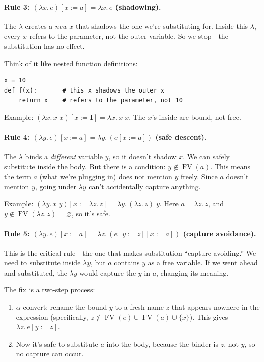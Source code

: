 \documentclass[11pt,a4paper]{article}
\theoremstyle{definition}
\newcommand{\lam}{\lambda}
\newcommand{\FV}{\operatorname{FV}}
\begin{document}
\paragraph{Rule 3: $(\lam x.\, e)[x := a] = \lam x.\, e$ (shadowing).}
The $\lam$ creates a \emph{new} $x$ that shadows the one we're substituting
for. Inside this $\lam$, every $x$ refers to the parameter, not the outer
variable. So we stop---the substitution has no effect.

Think of it like nested function definitions:
\begin{verbatim}
x = 10
def f(x):       # this x shadows the outer x
    return x    # refers to the parameter, not 10
\end{verbatim}

Example: $(\lam x.\, x\;x)[x := \mathbf{I}] = \lam x.\, x\;x$. The
$x$'s inside are bound, not free.

\paragraph{Rule 4: $(\lam y.\, e)[x := a] = \lam y.\, (e[x := a])$ (safe descent).}
The $\lam$ binds a \emph{different} variable $y$, so it doesn't shadow $x$. We
can safely substitute inside the body. But there is a condition: $y \notin
\FV(a)$. This means the term $a$ (what we're plugging in) does not mention $y$
freely. Since $a$ doesn't mention $y$, going under $\lam y$ can't accidentally
capture anything.

Example: $(\lam y.\, x\;y)[x := \lam z.\, z] = \lam y.\, (\lam z.\, z)\;y$.
Here $a = \lam z.\, z$, and $y \notin \FV(\lam z.\, z) = \varnothing$, so it's
safe.

\paragraph{Rule 5: $(\lam y.\, e)[x := a] = \lam z.\, (e[y := z][x := a])$
(capture avoidance).}
This is the critical rule---the one that makes substitution ``capture-avoiding.''
We need to substitute inside $\lam y$, but $a$ contains $y$ as a free variable.
If we went ahead and substituted, the $\lam y$ would capture the $y$ in $a$,
changing its meaning.

The fix is a two-step process:
\begin{enumerate}[leftmargin=2em]
\item $\alpha$-convert: rename the bound $y$ to a fresh name $z$ that appears
  nowhere in the expression (specifically, $z \notin \FV(e) \cup \FV(a) \cup \{x\}$).
  This gives $\lam z.\, e[y := z]$.
\item Now it's safe to substitute $a$ into the body, because the binder is $z$,
  not $y$, so no capture can occur.
\end{enumerate}
\end{document}
